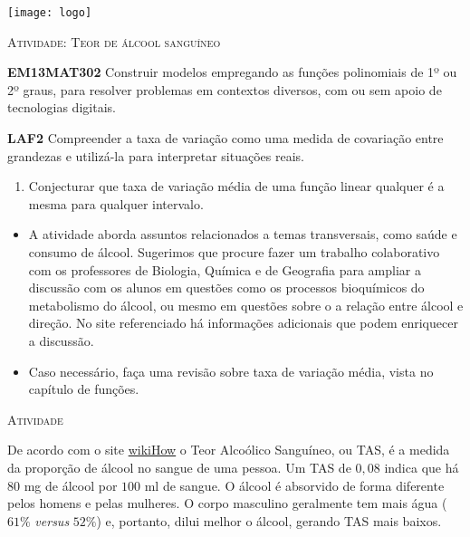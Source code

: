 \documentclass[10 pt,usenames,dvipsnames, oneside]{article}
\begin{document}
\begin{center}
  \begin{minipage}[l]{3cm}
\texttt{[image: logo]}    
\end{minipage}\hfill
\begin{minipage}[r]{.8\textwidth}
 {\Large \scshape Atividade: Teor de álcool sanguíneo}  
\end{minipage}
\end{center}
\vspace{.2cm}

\ifdefined\prof
\begin{objetivos}
\item \textbf{EM13MAT302} Construir modelos empregando as funções polinomiais de 1º ou 2º graus, para resolver problemas em contextos diversos, com ou sem apoio de tecnologias digitais.
\item \textbf{LAF2} Compreender a taxa de variação como uma medida de covariação entre grandezas e utilizá-la para interpretar situações reais.
\end{objetivos}

\begin{goals}
\begin{enumerate}
\item Conjecturar que taxa de variação média de uma função linear qualquer é a mesma para qualquer intervalo.
\end{enumerate}

\tcblower
\begin{itemize}
\item A atividade aborda assuntos relacionados a temas transversais, como saúde e consumo de álcool. Sugerimos que procure fazer um trabalho colaborativo com os professores de Biologia, Química e de Geografia para ampliar a discussão com os alunos em questões como os processos bioquímicos do metabolismo do álcool, ou mesmo em questões sobre o a relação entre álcool e direção. No site referenciado há informações adicionais que podem enriquecer a discussão.

\item Caso necessário, faça uma revisão sobre taxa de variação média, vista no capítulo de funções.
\end{itemize}
\end{goals}

\bigskip
\begin{center}
{\large \scshape Atividade}
\end{center}
\fi

De acordo com o site \href{https://pt.wikihow.com/Calcular-o-N\%C3\%ADvel-de-\%C3\%81lcool-no-Sangue}{wikiHow} o Teor Alcoólico Sanguíneo, ou TAS, é a medida da proporção de álcool no sangue de uma pessoa. Um TAS de \(0{,}08\) indica que há \(80\) mg de álcool por \(100\) ml de sangue. O álcool é absorvido de forma diferente pelos homens e pelas mulheres. O corpo masculino geralmente tem mais água (\(61\%\) \emph{versus} \(52\%\)) e, portanto, dilui melhor o álcool, gerando TAS mais baixos.
\end{document}
